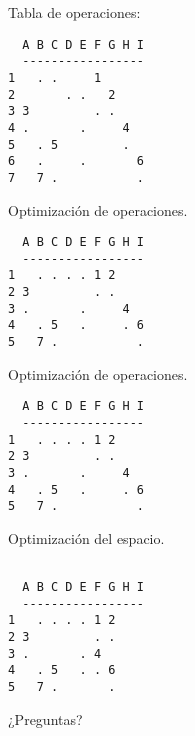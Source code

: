 \documentclass{beamer}
\begin{document}
\begin{frame}[fragile]
Tabla de operaciones:
\begin{lstlisting}
  A B C D E F G H I
  -----------------
1   . .     1      
2       . .   2        
3 3         . .        
4 .       .     4     
5   . 5         .
6   .     .       6
7   7 .           .
\end{lstlisting}
Optimización de operaciones.
\begin{lstlisting}
  A B C D E F G H I
  -----------------
1   . . . . 1 2    
2 3         . .       
3 .       .     4    
4   . 5   .     . 6
5   7 .           .
\end{lstlisting}
\end{frame}



\begin{frame}[fragile]
Optimización de operaciones.
\begin{lstlisting}
  A B C D E F G H I
  -----------------
1   . . . . 1 2    
2 3         . .       
3 .       .     4    
4   . 5   .     . 6
5   7 .           .
\end{lstlisting}
Optimización del espacio.
\begin{lstlisting}

  A B C D E F G H I
  -----------------
1   . . . . 1 2    
2 3         . .    
3 .       . 4      
4   . 5   . . 6    
5   7 .       .    
\end{lstlisting}
\end{frame}



\begin{frame}

\end{frame}



\begin{frame}
\center ¿Preguntas?
\end{frame}
\end{document}

